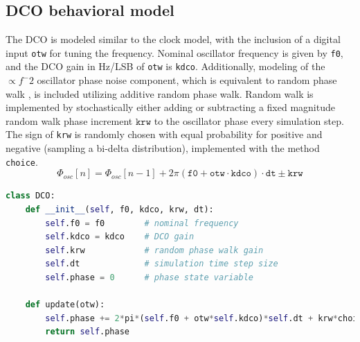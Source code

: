 \subsection{DCO behavioral model}
The DCO is modeled similar to the clock model, with the inclusion of a digital input \texttt{otw} for tuning the frequency. Nominal oscillator frequency is given by \texttt{f0}, and the DCO gain in Hz/LSB of \texttt{otw} is \texttt{kdco}. Additionally, modeling of the $\propto f^-2$ oscillator phase noise component, which is equivalent to random phase walk \cite{vannicola_varshney_1983}, is included utilizing additive random phase walk. Random walk is implemented by stochastically either adding or subtracting a fixed magnitude random walk phase increment $\texttt{krw}$ to the oscillator phase every simulation step. The sign of \texttt{krw} is randomly chosen with equal probability for positive and negative (sampling a bi-delta distribution), implemented with the method \texttt{choice}.
\begin{equation}\label{eq:dco_behavioral_model}
	\Phi_{osc}[n] = \Phi_{osc}[n-1] + 2\pi(\mathtt{f0}+\mathtt{otw}\cdot\mathtt{kdco})\cdot\mathtt{dt} \pm \mathtt{krw}
\end{equation}
\begin{lstlisting}[language={Python}, caption={DCO behavioral model Python pseudocode.}, label={dco_code}]
class DCO:
	def __init__(self, f0, kdco, krw, dt):
		self.f0 = f0		# nominal frequency
		self.kdco = kdco 	# DCO gain
		self.krw			# random phase walk gain
		self.dt 			# simulation time step size
		self.phase = 0		# phase state variable

	def update(otw):
		self.phase += 2*pi*(self.f0 + otw*self.kdco)*self.dt + krw*choice([-1,1])
		return self.phase
   \end{lstlisting}

